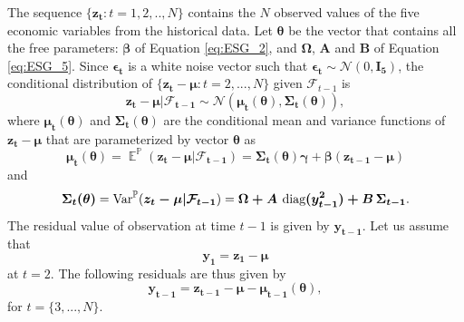 \documentclass{sfuthesis}
\DeclareMathOperator{\E}{\mathbb{E}}
\numberwithin{equation}{chapter}
\begin{document}
	
		\justify
		The sequence $\{\boldsymbol{z_{t}}: t=1, 2, .., N\}$ contains the $N$ observed values of the five economic variables from the historical data. Let $\boldsymbol{\theta}$ be the vector that contains all the free parameters: $\boldsymbol{\beta}$ of Equation \eqref{eq:ESG_2}, and $\boldsymbol{\Omega}$, $\boldsymbol{A}$ and $\boldsymbol{B}$ of Equation \eqref{eq:ESG_5}. Since $\boldsymbol{\epsilon_{t}}$ is a white noise vector such that $\boldsymbol{\epsilon_{t}}\sim \mathcal{N}(0, \boldsymbol{I_{5}})$,  the conditional distribution of $\{\boldsymbol{z_{t}-\mu}: t=2,...,N\}$ given $\mathcal{F}_{t-1}$ is
		\begin{equation}
		\label{eq:EMR_1}
		\boldsymbol{z_{t}-\mu|\mathcal{F}_{t-1}} \sim \mathcal{N}\left(\boldsymbol{\mu_{t}(\theta), \Sigma_{t}(\theta)}\right),
		\end{equation}
		where $\boldsymbol{\mu_{t}(\theta)}$ and $\boldsymbol{\Sigma_{t}(\theta)}$ are the conditional mean and variance functions of $\boldsymbol{z_{t}-\mu}$ that are parameterized by vector $\boldsymbol{\theta}$ as
		\begin{equation}
		\label{eq:EMR_2}
		\boldsymbol{\mu_t(\theta)} =\E^{\mathbb{P}}(\boldsymbol{z_{t}-\mu|\mathcal{F}_{t-1}})=\boldsymbol{\Sigma_{t}(\theta) \gamma + \beta (z_{t-1}-\mu)}
		\end{equation}
		and
		\begin{equation}
		\label{eq:EMR_3}
		\boldsymbol{\Sigma_t(\theta)} =\text{Var}^{\mathbb{P}}(\boldsymbol{z_{t}-\mu|\mathcal{F}_{t-1}})= \boldsymbol{\Omega + A \, \, \textnormal{diag}(y_{t-1}^2) + B\, \Sigma_{t-1}}.
		\end{equation}
		The residual value of observation at time $t-1$ is given by $\boldsymbol{y_{t-1}}$. Let us assume that
		\begin{equation}
		\label{eq:EMR_4}
		\boldsymbol{y_1} = \boldsymbol{z_1 - \mu}
		\end{equation}
		at $t=2$. The following residuals are thus given by 
		\begin{equation}
		\label{eq:EMR_5}
		\boldsymbol{y_{t-1}}  = \boldsymbol{z_{t-1} - \mu - \mu_{t-1}(\theta)}, 
		\end{equation}
		for $t = \{3,...,N\}$.
	
\end{document}
